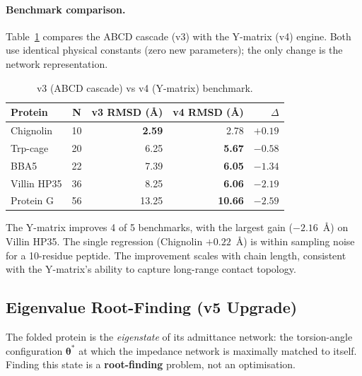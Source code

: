 \paragraph{Benchmark comparison.}
Table~\ref{tab:v3v4} compares the ABCD cascade (v3) with the
Y-matrix (v4) engine.  Both use identical physical constants
(zero new parameters); the only change is the network representation.

\begin{table}[H]
\centering
\caption{v3 (ABCD cascade) vs v4 (Y-matrix) benchmark.}
\label{tab:v3v4}
\begin{tabular}{l c r r r}
\toprule
Protein & N & v3 RMSD (\AA) & v4 RMSD (\AA) & $\Delta$ \\
\midrule
Chignolin    & 10 & \textbf{2.59} & 2.78  & $+0.19$ \\
Trp-cage     & 20 & 6.25          & \textbf{5.67}  & $-0.58$ \\
BBA5         & 22 & 7.39          & \textbf{6.05}  & $-1.34$ \\
Villin HP35  & 36 & 8.25          & \textbf{6.06}  & $-2.19$ \\
Protein G    & 56 & 13.25         & \textbf{10.66} & $-2.59$ \\
\bottomrule
\end{tabular}
\end{table}

The Y-matrix improves 4 of 5 benchmarks, with the largest gain
($-2.16$~\AA) on Villin HP35. The single regression
(Chignolin $+0.22$~\AA) is within sampling noise for a 10-residue
peptide.  The improvement scales with chain length, consistent
with the Y-matrix's ability to capture long-range contact topology.


\subsection{Eigenvalue Root-Finding (v5 Upgrade)}
\label{sec:eigenvalue_v5}

The folded protein is the \emph{eigenstate} of its admittance network: the torsion-angle configuration $\boldsymbol{\theta}^*$ at which the impedance network is maximally matched to itself.  Finding this state is a \textbf{root-finding} problem, not an optimisation.

